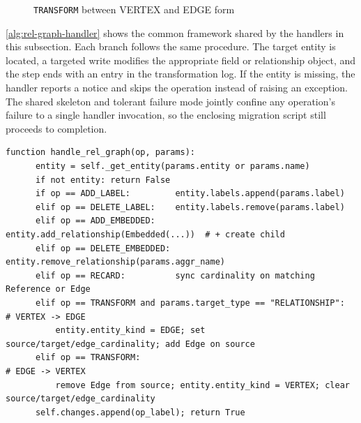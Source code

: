 \begin{figure}[htbp]
    \caption{\texttt{TRANSFORM} between VERTEX and EDGE form}
    \label{fig:transform-vertex-edge}
  \end{figure}

 \autoref{alg:rel-graph-handler} shows the common framework shared by
  the handlers in this subsection. Each branch follows the same
  procedure. The target entity is located, a targeted write modifies
  the appropriate field or relationship object, and the step ends with
  an entry in the transformation log. If the entity is missing, the
  handler reports a notice and skips the operation instead of raising
  an exception. The shared skeleton and tolerant failure mode jointly
  confine any operation's failure to a single handler invocation, so
  the enclosing migration script still proceeds to completion.

  \begin{lstlisting}[basicstyle=\small\ttfamily,
    caption={Algorithm of the relationship and graph handlers},
    label={alg:rel-graph-handler}]
  function handle_rel_graph(op, params):
      entity = self._get_entity(params.entity or params.name)
      if not entity: return False
      if op == ADD_LABEL:         entity.labels.append(params.label)
      elif op == DELETE_LABEL:    entity.labels.remove(params.label)
      elif op == ADD_EMBEDDED:    entity.add_relationship(Embedded(...))  # + create child
      elif op == DELETE_EMBEDDED: entity.remove_relationship(params.aggr_name)
      elif op == RECARD:          sync cardinality on matching Reference or Edge
      elif op == TRANSFORM and params.target_type == "RELATIONSHIP":  # VERTEX -> EDGE
          entity.entity_kind = EDGE; set source/target/edge_cardinality; add Edge on source
      elif op == TRANSFORM:                                            # EDGE -> VERTEX
          remove Edge from source; entity.entity_kind = VERTEX; clear source/target/edge_cardinality
      self.changes.append(op_label); return True
  \end{lstlisting}

